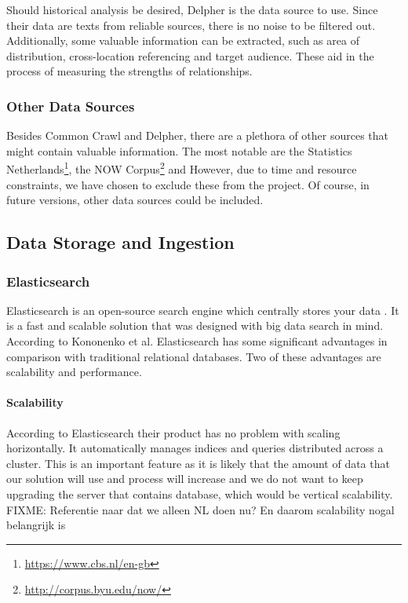 Should historical analysis be desired, Delpher is the data source to use. Since their data are texts from reliable sources, there is no noise to be filtered out. Additionally, some valuable information can be extracted, such as area of distribution, cross-location referencing and target audience. These aid in the process of measuring the strengths of relationships.

\subsubsection{Other Data Sources}
Besides Common Crawl and Delpher, there are a plethora of other sources that might contain valuable information. The most notable are the Statistics Netherlands\footnote{\url{https://www.cbs.nl/en-gb}}, the NOW Corpus\footnote{\url{http://corpus.byu.edu/now/}} and However, due to time and resource constraints, we have chosen to exclude these from the project. Of course, in future versions, other data sources could be included.


\subsection{Data Storage and Ingestion}
\subsubsection{Elasticsearch}
Elasticsearch is an open-source search engine which centrally stores your data \cite{Elasticsearch}. It is a fast and scalable solution that was designed with big data search in mind. According to Kononenko et al. \cite{Kononenko2014} Elasticsearch has some significant advantages in comparison with traditional relational databases. Two of these advantages are scalability and performance. 

\paragraph{Scalability} According to Elasticsearch \cite{Elasticsearch} their product has no problem with scaling horizontally. It automatically manages indices and queries distributed across a cluster. This is an important feature as it is likely that the amount of data that our solution will use and process will increase and we do not want to keep upgrading the server that contains database, which would be vertical scalability. {\color{red} FIXME: Referentie naar dat we alleen NL doen nu? En daarom scalability nogal belangrijk is}

